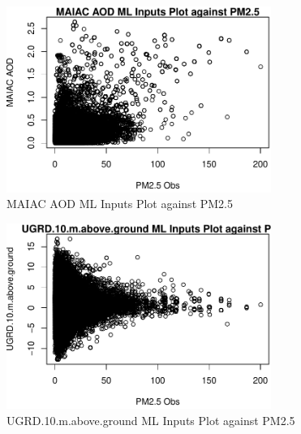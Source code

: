 \begin{figure} 
\centering  
\includegraphics[width=0.77\textwidth]{Code_Outputs/ML_input_report_ML_input_PM25_Step5_part_d_de_duplicated_aves_ML_inputpdfs_MAIAC_AODvPM25_Obs.pdf} 
\caption{\label{fig:ML_input_report_ML_input_PM25_Step5_part_d_de_duplicated_aves_ML_inputpdfsMAIAC_AODvPM25_Obs}MAIAC AOD ML Inputs Plot against PM2.5} 
\end{figure} 
 

\begin{figure} 
\centering  
\includegraphics[width=0.77\textwidth]{Code_Outputs/ML_input_report_ML_input_PM25_Step5_part_d_de_duplicated_aves_ML_inputpdfs_UGRD10mabovegroundvPM25_Obs.pdf} 
\caption{\label{fig:ML_input_report_ML_input_PM25_Step5_part_d_de_duplicated_aves_ML_inputpdfsUGRD10mabovegroundvPM25_Obs}UGRD.10.m.above.ground ML Inputs Plot against PM2.5} 
\end{figure} 
 
